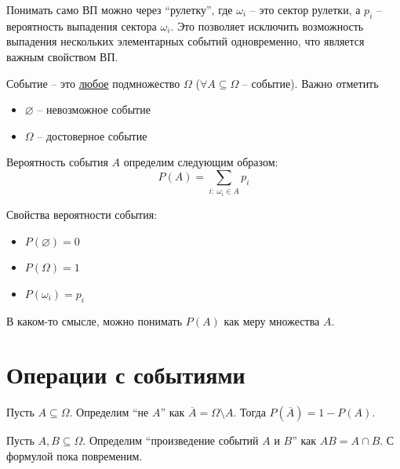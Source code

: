 \documentclass[11pt]{article}
\begin{document}
\begin{remark}
  Понимать само ВП можно через ``рулетку'', где $\omega_i$ 
  -- это сектор рулетки, а $p_i$ -- вероятность выпадения 
  сектора $\omega_i$. Это позволяет исключить возможность 
  выпадения нескольких элементарных событий одновременно, 
  что является важным свойством ВП.
\end{remark}

\begin{definition}
  Событие -- это \underline{любое} подмножество $\Omega$ 
  ($\forall A \subseteq \Omega$ -- событие). Важно отметить
  \begin{itemize}
    \item $\varnothing$ -- невозможное событие
    \item $\Omega$ -- достоверное событие
  \end{itemize}
\end{definition}

\begin{definition}
  Вероятность события $A$ определим следующим образом:
  \[P(A) = \sum_{i: \ \omega_i \in A} p_i\]
\end{definition}

\begin{consequence}
  Свойства вероятности события:
  \begin{itemize}
    \item $P(\varnothing) = 0$
    \item $P(\Omega) = 1$
    \item $P(\omega_i) = p_i$
  \end{itemize}
\end{consequence}

\begin{remark}
  В каком-то смысле, можно понимать $P(A)$ как меру 
  множества $A$.
\end{remark}

\section{Операции с событиями}

\begin{definition}
  Пусть $A \subseteq \Omega$. Определим ``не $A$'' как 
  $\overline{A} = \Omega \setminus A$. Тогда 
  $P(\overline{A}) = 1 - P(A)$.
\end{definition}

\begin{definition}
  Пусть $A, B \subseteq \Omega$. Определим ``произведение 
  событий $A$ и $B$'' как $AB = A \cap B$. С формулой пока 
  повременим.
\end{definition}
\end{document}
